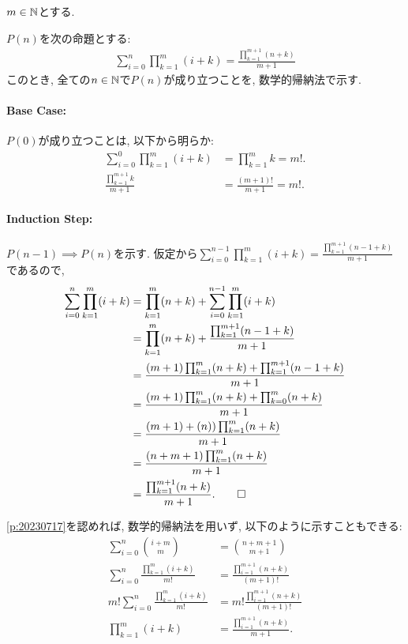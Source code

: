 \begin{proof*}
  $m\in \mathbb{N}$とする.
  
  $P(n)$を次の命題とする:
  \begin{align*}
    \sum_{i=0}^n \prod_{k=1}^{m}(i+k)=\frac{\prod_{k=1}^{m+1}(n+k)}{m+1}
  \end{align*}
  このとき,
  全ての$n\in\mathbb{N}$で$P(n)$が成り立つことを,
  数学的帰納法で示す.

  \paragraph{Base Case:}
  $P(0)$が成り立つことは, 以下から明らか:
  \begin{align*}
    \sum_{i=0}^0 \prod_{k=1}^{m}(i+k)&=\prod_{k=1}^{m}k=m!.\\
    \frac{\prod_{k=1}^{m+1}k}{m+1}&=\frac{(m+1)!}{m+1}=m!.
  \end{align*}

  \paragraph{Induction Step:}
  $P(n-1)\implies P(n)$を示す.
  仮定から$\sum_{i=0}^{n-1} \prod_{k=1}^{m}(i+k)=\frac{\prod_{k=1}^{m+1}(n-1+k)}{m+1}$であるので,
  \begin{align*}
    \sum_{i=0}^n \prod_{k=1}^{m}(i+k)
    &=\prod_{k=1}^{m}(n+k)+\sum_{i=0}^{n-1} \prod_{k=1}^{m}(i+k)\\
    &=\prod_{k=1}^{m}(n+k)+\frac{\prod_{k=1}^{m+1}(n-1+k)}{m+1}\\
    &=\frac{(m+1)\prod_{k=1}^{m}(n+k)+\prod_{k=1}^{m+1}(n-1+k)}{m+1}\\
    &=\frac{(m+1)\prod_{k=1}^{m}(n+k)+\prod_{k=0}^{m}(n+k)}{m+1}\\
    &=\frac{(m+1)+(n))\prod_{k=1}^{m}(n+k)}{m+1}\\
    &=\frac{(n+m+1)\prod_{k=1}^{m}(n+k)}{m+1}\\
    &=\frac{\prod_{k=1}^{m+1}(n+k)}{m+1}
    .\qedhere
  \end{align*}
\end{proof*}

\begin{rem}
    \cref{p:20230717}を認めれば,
  数学的帰納法を用いず, 以下のように示すこともできる:
  \begin{align*}
    \sum_{i=0}^n \binom{i+m}{m}&=\binom{n+m+1}{m+1}\\
    \sum_{i=0}^n \frac{\prod_{k=1}^{m}(i+k)}{m!}&=\frac{\prod_{i=1}^{m+1}(n+k)}{(m+1)!}\\
    m!\sum_{i=0}^n \frac{\prod_{k=1}^{m}(i+k)}{m!}&=m!\frac{\prod_{i=1}^{m+1}(n+k)}{(m+1)!}\\
    \prod_{k=1}^{m}(i+k)&=\frac{\prod_{i=1}^{m+1}(n+k)}{m+1}.
  \end{align*}
\end{rem}



